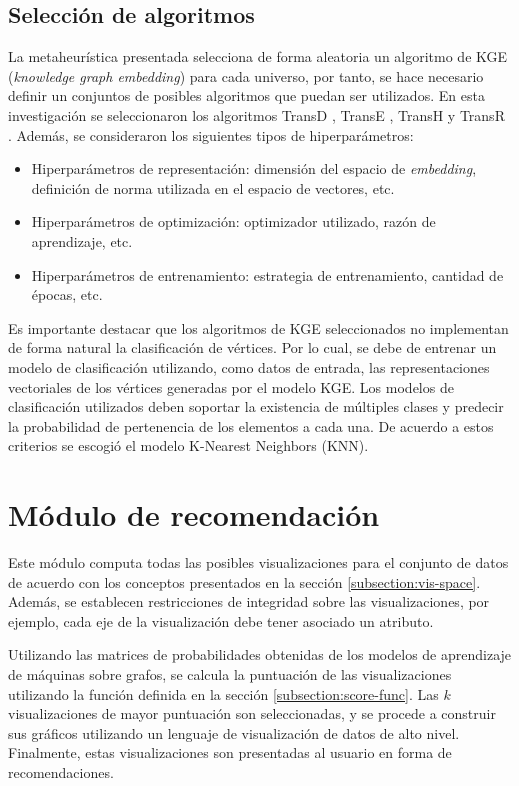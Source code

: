 \subsection{Selecci\'on de algoritmos}

La metaheur\'istica presentada selecciona de 
forma aleatoria un algoritmo de KGE (\textit{knowledge graph embedding}) para
cada universo, por tanto, se hace necesario definir
un conjuntos de posibles algoritmos que puedan ser
utilizados. En esta investigaci\'on se seleccionaron
los algoritmos TransD \cite{ji-etal-2015-knowledge}, TransE \cite{bordes2013translating}, TransH \cite{wang2014knowledge} y TransR \cite{lin2015learning}.
Adem\'as, se
consideraron los siguientes tipos de hiperpar\'ametros:

\begin{itemize}
    \item Hiperpar\'ametros de representaci\'on: dimensi\'on del espacio de \textit{embedding}, definici\'on de norma utilizada en el espacio de vectores, etc.
    \item Hiperpar\'ametros de optimizaci\'on: optimizador utilizado, raz\'on de aprendizaje, etc.
    \item Hiperpar\'ametros de entrenamiento: estrategia de entrenamiento, cantidad de \'epocas, etc.
\end{itemize}

Es importante destacar que los algoritmos de
KGE seleccionados no implementan de forma natural la
clasificaci\'on de v\'ertices. Por lo cual, se debe de
entrenar un modelo de clasificaci\'on utilizando, como datos
de entrada, las representaciones vectoriales de los
v\'ertices generadas por el modelo KGE. Los modelos
de clasificaci\'on utilizados
deben soportar la existencia de m\'ultiples clases y
predecir la probabilidad de pertenencia de los elementos a cada una. De
acuerdo a estos criterios se escogi\'o el modelo K-Nearest Neighbors (KNN).


\section{M\'odulo de recomendaci\'on}
Este m\'odulo computa todas las posibles visualizaciones para el conjunto de
datos de acuerdo con los conceptos presentados en la secci\'on \ref{subsection:vis-space}.
Adem\'as, se establecen restricciones de integridad sobre las visualizaciones, por ejemplo,
cada eje de la visualizaci\'on debe tener asociado un atributo.

Utilizando las matrices de probabilidades obtenidas
de los modelos de aprendizaje de m\'aquinas sobre grafos, se calcula la puntuaci\'on de las visualizaciones
utilizando la funci\'on definida en la secci\'on \ref{subsection:score-func}. Las $k$ visualizaciones
de mayor puntuaci\'on son seleccionadas, y se procede a construir sus
gr\'aficos utilizando un lenguaje de visualizaci\'on de datos de alto nivel. Finalmente,
estas visualizaciones son presentadas al usuario en forma de recomendaciones.



